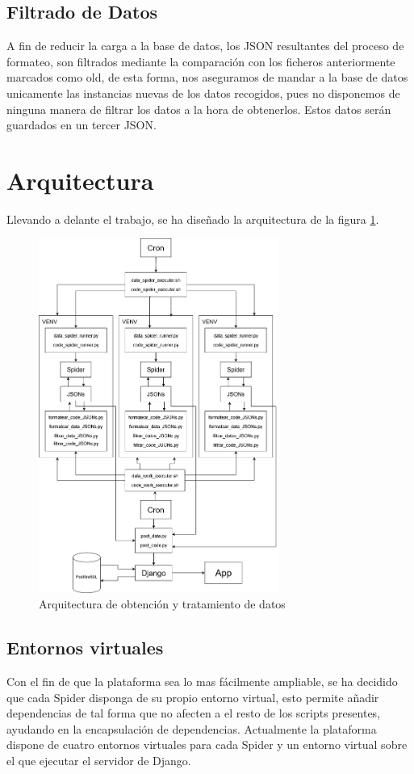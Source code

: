 \subsection{Filtrado de Datos}
A fin de reducir la carga a la base de datos, los JSON resultantes del proceso de formateo, son filtrados mediante la comparación con los ficheros anteriormente marcados como old, de esta forma, nos aseguramos de mandar a la base de datos unicamente las instancias nuevas de los datos recogidos, pues no disponemos de ninguna manera de filtrar los datos a la hora de obtenerlos. Estos datos serán guardados en un tercer JSON.

\section{Arquitectura}
Llevando a delante el trabajo, se ha diseñado la arquitectura de la figura \ref{fig:ej7}.

\begin{figure} [h]
	\centering
	\includegraphics[width=0.7\textwidth]{fig/arquitectura.png}
	\caption[Arquitectura de obtención y tratamiento de datos]{Arquitectura de obtención y tratamiento de datos}
	\label{fig:ej7}
\end{figure}

\subsection{Entornos virtuales}
Con el fin de que la plataforma sea lo mas fácilmente ampliable, se ha decidido que cada Spider disponga de su propio entorno virtual, esto permite añadir dependencias de tal forma que no afecten a el resto de los scripts presentes, ayudando en la encapsulación de dependencias.\newline
\newline
Actualmente la plataforma dispone de cuatro entornos virtuales para cada Spider y un entorno virtual sobre el que ejecutar el servidor de Django.

